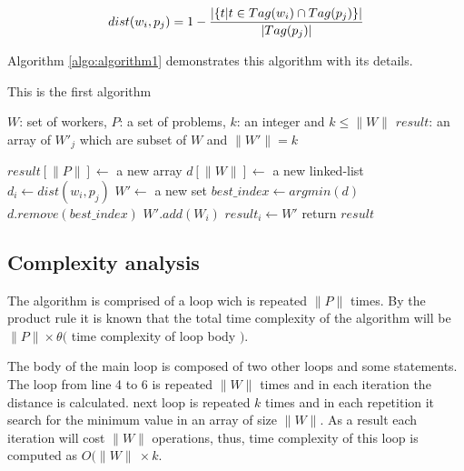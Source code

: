 \documentclass{template}
\begin{document}
\begin{equation}
 dist(w_i, p_j) = 1 - {{|\{t | t \in Tag(w_i) \cap Tag(p_j)\}| \over {|Tag(p_j)|}}}
 \label{f:dist}
\end{equation}

Algorithm \ref{algo:algorithm1} demonstrates this algorithm with its details.

\begin{algorithm}
        \caption{This is the first algorithm}
        \label{algo:algorithm1}
        \begin{algorithmic}[1]
                \REQUIRE 
                \(W\): set of workers, \(P\): a set of problems,
                \(k\): an integer and \(k \le \lVert W \rVert\)
                \ENSURE 
                \(result\): an array of \(W'_j\) which are subset of \(W\) and \(\lVert W'\rVert = k\)

                \STATE \(result[\lVert P \rVert] \leftarrow \) a new array
                        \STATE \(d[\lVert W \rVert] \leftarrow \) a new linked-list
                                \STATE
                                \(d_i \leftarrow dist(w_i, p_j)\) 
                        \ENDFOR
                        \STATE \(W' \leftarrow\) a new set
                                \STATE
                                \(best\_index \leftarrow argmin(d)\)
                                \STATE
                                \(d.remove(best\_index)\)
                                \STATE
                                \(W'.add(W_i)\)
                        \ENDFOR
                        \STATE \(result_i \leftarrow W'\)
                \ENDFOR
                \STATE return \(result\)
        \end{algorithmic}
\end{algorithm}

\subsection{Complexity analysis}
The algorithm is comprised of a loop wich is repeated \(\lVert P \rVert\) times.
By the product rule it is known that the total time complexity of the algorithm will
be \(\lVert P \rVert \times \theta(\) time complexity of loop body \()\).

The body of the main loop is composed of two other loops and some statements.
The loop from line 4 to 6 is repeated \(\lVert W \rVert\) times and in each iteration the distance is calculated.
next loop is repeated \(k\) times and in each repetition it search for the minimum value in an array of
size \(\lVert W \rVert\). As a result each iteration will cost \(\lVert W \rVert\) operations, thus, time
complexity of this loop is computed as \(O(\lVert W \rVert\ \times k \).
\end{document}
